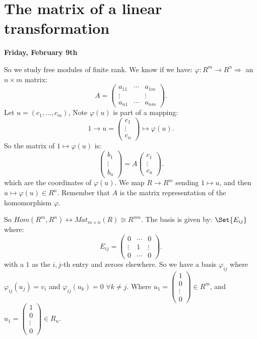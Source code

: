 \documentclass[9pt,reqno,twoside]{amsbook}
\theoremstyle{plain}
\numberwithin{section}{chapter}
\numberwithin{equation}{chapter}
\theoremstyle{definition}
\theoremstyle{remark}
\theoremstyle{plain}
\newcommand{\lpar}{\left(}
\newcommand{\rpar}{\right)}
\renewcommand{\phi}{\varphi}
\begin{document}
\vspace{5mm}

\section{The matrix of a linear transformation}
\textbf{Friday, February 9th}
\vspace{5mm}

So we study free modules of finite rank. We know if we have: $\phi:R^m \to R^n \Rightarrow$ an $n \times m$ matrix:
$$
A = \lpar 
\begin{matrix}
a_{11}& \cdots &a_{1m}\\
\vdots & & \vdots\\
a_{n1}& \cdots & a_{nm}
\end{matrix} \rpar. 
$$
Let $u = (c_1,...,c_m)$,
Note $\phi(u)$ is part of a mapping:
$$
1 \to u = \lpar 
\begin{matrix}
c_1\\
\vdots\\
c_n
\end{matrix} \rpar \mapsto \phi(u).
$$
So the matrix of $1 \mapsto \phi(u)$ is:
$$
\lpar 
\begin{matrix}
b_1\\
\vdots\\
b_n
\end{matrix} \rpar = A
\lpar 
\begin{matrix}
c_1\\
\vdots\\
c_n
\end{matrix} \rpar. 
$$
which are the coordinates of $\phi(u)$. We map $R \to R^m$ sending $1 \mapsto u$, and then $u \mapsto \phi(u) \in R^n$. Remember that $A$ is the matrix representation of the homomorphism $\phi$. 

So $Hom(R^m,R^n) \leftrightarrow Mat_{m \times n}(R) \cong R^{mn}$. The basis is given by: $\Set{E_{ij}}$ where:
$$
E_{ij} = \lpar 
\begin{matrix}
0 & \cdots & 0\\
\vdots & 1 &\vdots\\
0& \cdots & 0
\end{matrix} \rpar.
$$
with a $1$ as the $i,j$-th entry and zeroes elsewhere. So we have a basis $\phi_{ij}$ where $\phi_{ij}(u_j) = v_i$ and $\phi_{ij}(u_k) = 0$ $\forall k \neq j$. Where $u_1 = \lpar \begin{matrix}
1\\
0\\
\vdots\\
0
\end{matrix} \rpar \in R^m$, and $u_1 = \lpar \begin{matrix}
1\\
0\\
\vdots\\
0
\end{matrix} \rpar \in R_n$. 
\end{document}
